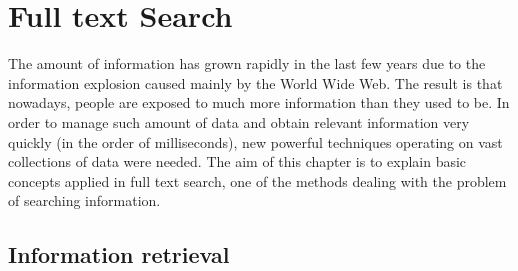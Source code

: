 \chapter{Full text Search}
\label{chap:fulltext}

The amount of information has grown rapidly in the last few years due to the information explosion caused mainly by the World Wide Web. 
The result is that nowadays, people are exposed to much more information than they used to be. 
In order to manage such amount of data and obtain relevant information very quickly (in the order of milliseconds), new powerful techniques operating on vast collections of data were needed.
The aim of this chapter is to explain basic concepts applied in full
text search, one of the methods dealing with the problem of searching information.

%
%


\section{Information retrieval}





